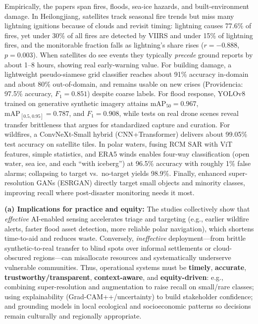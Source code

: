 \documentclass[conference,a4paper]{IEEEtran}
\begin{document}
Empirically, the papers span fires, floods, sea-ice hazards, and built-environment damage. In Heilongjiang, satellites track seasonal fire trends but miss many lightning ignitions because of clouds and revisit timing: lightning causes 77.6\% of fires, yet under 30\% of all fires are detected by VIIRS and under 15\% of lightning fires, and the monitorable fraction falls as lightning’s share rises ($r=-0.888$, $p=0.003$). When satellites do see events they typically \emph{precede} ground reports by about 1--8 hours, showing real early-warning value. For building damage, a lightweight pseudo-siamese grid classifier reaches about 91\% accuracy in-domain and about 80\% out-of-domain, and remains usable on new crises (Providencia: 97.5\% accuracy, $F_1=0.851$) despite coarse labels. For flood response, YOLOv8 trained on generative synthetic imagery attains $\text{mAP}_{50}=0.967$, $\text{mAP}_{[0.5,0.95]}=0.787$, and $F_1=0.908$, while tests on real drone scenes reveal transfer brittleness that argues for standardized capture and curation. For wildfires, a ConvNeXt-Small hybrid (CNN+Transformer) delivers about 99.05\% test accuracy on satellite tiles. In polar waters, fusing RCM SAR with ViT features, simple statistics, and ERA5 winds enables four-way classification (open water, sea ice, and each “with iceberg”) at 96.5\% accuracy with roughly 1\% false alarms; collapsing to target vs.\ no-target yields 98.9\%. Finally, enhanced super-resolution GANs (ESRGAN) directly target small objects and minority classes, improving recall where post-disaster monitoring needs it most.

\noindent\hspace*{1em}\textbf{(a) Implications for practice and equity:}
The studies collectively show that \emph{effective} AI-enabled sensing accelerates triage and targeting (e.g., earlier wildfire alerts, faster flood asset detection, more reliable polar navigation), which shortens time-to-aid and reduces waste. Conversely, \emph{ineffective} deployment---from brittle synthetic-to-real transfer to blind spots over informal settlements or cloud-obscured regions---can misallocate resources and systematically underserve vulnerable communities. Thus, operational systems must be \textbf{timely}, \textbf{accurate}, \textbf{trustworthy/transparent}, \textbf{context-aware}, and \textbf{equity-driven}: e.g., combining super-resolution and augmentation to raise recall on small/rare classes; using explainability (Grad-CAM++/uncertainty) to build stakeholder confidence; and grounding models in local ecological and socioeconomic patterns so decisions remain culturally and regionally appropriate.
\end{document}
